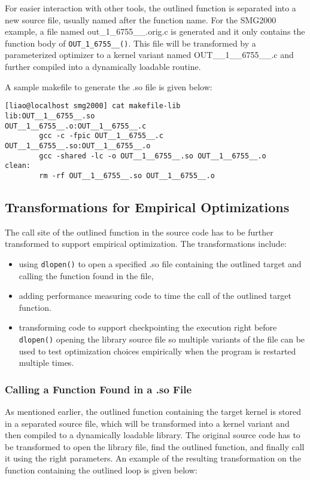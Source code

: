 For easier interaction with other tools, the outlined function is separated
into a new source file, usually named after 
the function name.  For the SMG2000 example, a file named out\_1\_6755\_\_.orig.c 
is generated and it only contains the function body of \lstinline{OUT_1_6755__()}. 
This file will be transformed by a parameterized optimizer to a kernel
variant named OUT\_\_1\_\_6755\_\_.c and further compiled into a dynamically
loadable routine.

A sample makefile to generate the .so file is given below: 

{\mySmallFontSize
\begin{verbatim}
[liao@localhost smg2000] cat makefile-lib
lib:OUT__1__6755__.so
OUT__1__6755__.o:OUT__1__6755__.c
        gcc -c -fpic OUT__1__6755__.c
OUT__1__6755__.so:OUT__1__6755__.o
        gcc -shared -lc -o OUT__1__6755__.so OUT__1__6755__.o
clean:
        rm -rf OUT__1__6755__.so OUT__1__6755__.o
\end{verbatim}
}

\subsection{Transformations for Empirical Optimizations}
The call site of the outlined function in the source code has to be further transformed to support empirical optimization. The transformations include:
\begin{itemize}
\item using \lstinline{dlopen()} to open a specified .so file containing
the outlined target and calling the function found in the file,
\item adding performance measuring code to time the call of the outlined target function.
\item transforming code to support checkpointing the execution right before
\lstinline{dlopen()} opening the library source file so multiple variants of the file can be used to test optimization choices empirically when the program is restarted multiple times.
\end{itemize}
\subsubsection{Calling a Function Found in a .so File}
As mentioned earlier, the outlined function containing the target kernel is
stored in a separated source file, which will be transformed into a kernel variant
and then compiled to a dynamically loadable library. 
The original source code has to be transformed to open the library file,
find the outlined function, and finally call it using the right
parameters. An example of the resulting transformation on the function containing the
outlined loop is given below:


